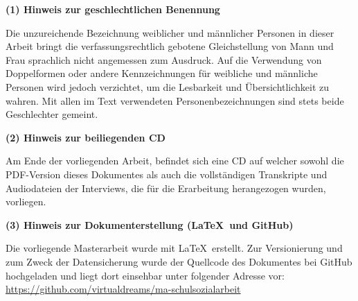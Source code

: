 \vspace*{\fill}

\begin{flushleft}
\textbf{(1) Hinweis zur geschlechtlichen Benennung}
\end{flushleft}
Die unzureichende Bezeichnung weiblicher und männlicher Personen in dieser Arbeit bringt die verfassungsrechtlich gebotene Gleichstellung von Mann und Frau sprachlich nicht angemessen zum Ausdruck. Auf die Verwendung von Doppelformen oder andere Kennzeichnungen für weibliche und männliche Personen wird jedoch verzichtet, um die Lesbarkeit und Übersichtlichkeit zu wahren. Mit allen im Text verwendeten Personenbezeichnungen sind stets beide Geschlechter gemeint.

\begin{flushleft}
\textbf{(2) Hinweis zur beiliegenden CD}
\end{flushleft}
Am Ende der vorliegenden Arbeit, befindet sich eine CD auf welcher sowohl die PDF-Version dieses Dokumentes als auch die vollständigen Transkripte und Audiodateien der Interviews, die für die Erarbeitung herangezogen wurden, vorliegen.

\begin{flushleft}
\textbf{(3) Hinweis zur Dokumenterstellung (\LaTeX\ und GitHub)}
\end{flushleft}
Die vorliegende Masterarbeit wurde mit \LaTeX\ erstellt. Zur Versionierung und zum Zweck der Datensicherung wurde der Quellcode des Dokumentes bei GitHub hochgeladen und liegt dort einsehbar unter folgender Adresse vor:\\
\url{https://github.com/virtualdreams/ma-schulsozialarbeit}